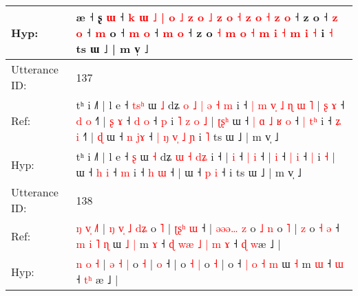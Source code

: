 \documentclass[10pt]{article}
\DeclareRobustCommand{\hl}[1]{{\textcolor{red}{#1}}}
\begin{document}
\begin{longtable}{ll}
 \\
Hyp: & æ ˧ ʂ \hl{ɯ} ˧\hl{}\hl{}\hl{} \hl{}\hl{k} \hl{ɯ} \hl{˩} \hl{|} \hl{o} \hl{}\hl{˩} \hl{z} \hl{o} \hl{˩} \hl{z} \hl{o} \hl{˧} \hl{z} \hl{}\hl{o} \hl{˧} \hl{z} \hl{o} ˧ z o ˧\hl{}\hl{} \hl{z} \hl{}\hl{o} ˧\hl{}\hl{} \hl{m} o ˧ \hl{m} \hl{}\hl{o} ˧\hl{}\hl{} \hl{m} \hl{o} ˧ z o \hl{˧} \hl{m} \hl{o} \hl{˧} \hl{m} \hl{i}\hl{ }\hl{˧} \hl{m} \hl{i} \hl{˧} i \hl{˧} ts ɯ ˩ | m v̩ ˩
 \\
\midrule
Utterance ID: & 137 \\
Ref: & tʰ i ˩˥ | l e ˧ \hl{t}\hl{s}\hl{ʰ} ɯ \hl{˩} dʑ\hl{ }\hl{o}\hl{ }\hl{˩} \hl{|} \hl{ə} \hl{˧}\hl{ }\hl{m} i ˧\hl{ }\hl{|}\hl{ }\hl{m}\hl{ }\hl{v}\hl{̩}\hl{ }\hl{˩}\hl{ }\hl{ɳ}\hl{ }\hl{ɯ}\hl{ }\hl{˥} |\hl{ }\hl{ʂ} \hl{ɤ} ˧ \hl{d} \hl{o} ˧\hl{˥} |\hl{ }\hl{ʂ} \hl{ɤ} ˧ \hl{d} \hl{o} ˧ \hl{p} i\hl{ }\hl{˥}\hl{ }\hl{z}\hl{ }\hl{o} \hl{˩} |\hl{ }\hl{ʈ}\hl{ʂ}\hl{ʰ} ɯ ˧\hl{ }\hl{|}\hl{ }\hl{ɑ}\hl{ }\hl{˩} \hl{ʁ} \hl{o} ˧\hl{ }\hl{|} \hl{t}\hl{ʰ} i ˧ \hl{ʑ} \hl{i} ˧\hl{˥} |\hl{ }\hl{ɖ} ɯ ˧ \hl{n} \hl{j}\hl{ɤ} ˧\hl{ }\hl{|}\hl{ }\hl{ŋ}\hl{ }\hl{v}\hl{̩}\hl{ }\hl{˩}\hl{ }\hl{ɲ} i\hl{ }\hl{˥} ts ɯ ˩ | m v̩ ˩
 \\
Hyp: & tʰ i ˩˥ | l e ˧ \hl{}\hl{}\hl{ʂ} ɯ \hl{˧} dʑ\hl{}\hl{}\hl{}\hl{} \hl{ɯ} \hl{˧} \hl{}\hl{d}\hl{ʑ} i ˧\hl{}\hl{}\hl{}\hl{}\hl{}\hl{}\hl{}\hl{}\hl{}\hl{}\hl{}\hl{}\hl{}\hl{}\hl{} |\hl{}\hl{} \hl{i} ˧ \hl{|} \hl{i} ˧\hl{} |\hl{}\hl{} \hl{i} ˧ \hl{|} \hl{i} ˧ \hl{|} i\hl{}\hl{}\hl{}\hl{}\hl{}\hl{} \hl{˧} |\hl{}\hl{}\hl{}\hl{} ɯ ˧\hl{}\hl{}\hl{}\hl{}\hl{}\hl{} \hl{h} \hl{i} ˧\hl{}\hl{} \hl{}\hl{m} i ˧ \hl{h} \hl{ɯ} ˧\hl{} |\hl{}\hl{} ɯ ˧ \hl{p} \hl{}\hl{i} ˧\hl{}\hl{}\hl{}\hl{}\hl{}\hl{}\hl{}\hl{}\hl{}\hl{}\hl{} i\hl{}\hl{} ts ɯ ˩ | m v̩ ˩
 \\
\midrule
Utterance ID: & 138 \\
Ref: & \hl{ŋ} \hl{v}\hl{̩} \hl{˩}\hl{˥} |\hl{ }\hl{ŋ} \hl{v}\hl{̩} \hl{˩} \hl{d}\hl{ʑ} o \hl{˥} |\hl{ }\hl{ʈ}\hl{ʂ}\hl{ʰ} \hl{ɯ} ˧ |\hl{ }\hl{ə}\hl{ə}\hl{ə}\hl{…}\hl{ }\hl{z} o \hl{˩} \hl{n} o \hl{˥} |\hl{ }\hl{z} o\hl{ }\hl{˧}\hl{ }\hl{ə} ˧ \hl{m} \hl{i} \hl{˥} \hl{ɳ} ɯ\hl{ }\hl{˩} \hl{|} m \hl{ɤ} ˧\hl{ }\hl{ɖ}\hl{ }\hl{w}\hl{æ}\hl{ }\hl{˩}\hl{ }\hl{|}\hl{ }\hl{m} \hl{ɤ} ˧ \hl{ɖ}\hl{ }\hl{w}æ ˩ |
 \\
Hyp: & \hl{n} \hl{}\hl{o} \hl{}\hl{˧} |\hl{}\hl{} \hl{}\hl{ə} \hl{˧} \hl{}\hl{|} o \hl{˧} |\hl{}\hl{}\hl{}\hl{} \hl{o} ˧ |\hl{}\hl{}\hl{}\hl{}\hl{}\hl{}\hl{} o \hl{˧} \hl{|} o \hl{˧} |\hl{}\hl{} o\hl{}\hl{}\hl{}\hl{} ˧ \hl{|} \hl{o} \hl{˧} \hl{m} ɯ\hl{}\hl{} \hl{˧} m \hl{ɯ} ˧\hl{}\hl{}\hl{}\hl{}\hl{}\hl{}\hl{}\hl{}\hl{}\hl{}\hl{} \hl{ɯ} ˧ \hl{t}\hl{ʰ}\hl{ }æ ˩ |

\end{longtable}
\end{document}
